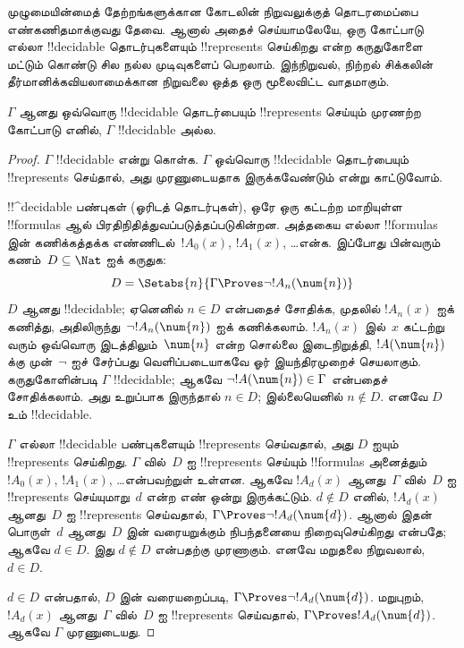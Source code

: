 \documentclass[../../../include/open-logic-section]{subfiles}
\begin{document}



முழுமையின்மைத் தேற்றங்களுக்கான கோடலின் நிறுவலுக்குத் தொடரமைப்பை
எண்கணிதமாக்குவது தேவை. ஆனால் அதைச் செய்யாமலேயே, ஒரு கோட்பாடு எல்லா
!!{decidable} தொடர்புகளையும் !!{represents} செய்கிறது என்ற கருதுகோளை
மட்டும் கொண்டு சில நல்ல முடிவுகளைப் பெறலாம். இந்நிறுவல், நிற்றல் சிக்கலின்
தீர்மானிக்கவியலாமைக்கான நிறுவலை ஒத்த ஒரு மூலைவிட்ட வாதமாகும்.

\begin{thm}
$\Gamma$ ஆனது ஒவ்வொரு !!{decidable} தொடர்பையும் !!{represents} செய்யும்
முரணற்ற கோட்பாடு எனில், $\Gamma$ !!{decidable} அல்ல.
\end{thm}

\begin{proof}
$\Gamma$ !!{decidable} என்று கொள்க. $\Gamma$ ஒவ்வொரு !!{decidable}
தொடர்பையும் !!{represents} செய்தால், அது முரணுடையதாக இருக்கவேண்டும் என்று
காட்டுவோம்.

!!^{decidable} பண்புகள் (ஓரிடத் தொடர்புகள்), ஒரே ஒரு கட்டற்ற மாறியுள்ள
!!{formula}s ஆல் பிரதிநிதித்துவப்படுத்தப்படுகின்றன. அத்தகைய எல்லா
!!{formula}s இன் கணிக்கத்தக்க எண்ணிடல்~$!A_0(x)$, $!A_1(x)$, \dots என்க.
இப்போது பின்வரும் கணம்~$D \subseteq \Nat$ ஐக் கருதுக:
\[
D = \Setabs{n}{\Gamma \Proves \lnot !A_n(\num{n})}
\]
$D$ ஆனது !!{decidable}; ஏனெனில் $n \in D$ என்பதைச் சோதிக்க, முதலில்
$!A_n(x)$ ஐக் கணித்து, அதிலிருந்து~$\lnot !A_n(\num{n})$ ஐக் கணிக்கலாம்.
$!A_n(x)$ இல்~$x$ கட்டற்று வரும் ஒவ்வொரு இடத்திலும்~$\num{n}$ என்ற சொல்லை
இடைநிறுத்தி, $!A(\num{n})$ க்கு முன்~$\lnot$ ஐச் சேர்ப்பது வெளிப்படையாகவே
ஓர் இயந்திரமுறைச் செயலாகும். கருதுகோளின்படி $\Gamma$ !!{decidable}; ஆகவே
$\lnot !A(\num{n}) \in \Gamma$ என்பதைச் சோதிக்கலாம். அது உறுப்பாக இருந்தால்
$n \in D$; இல்லையெனில் $n \notin D$. எனவே $D$ உம் !!{decidable}.

$\Gamma$ எல்லா !!{decidable} பண்புகளையும் !!{represents} செய்வதால், அது
$D$ ஐயும் !!{represents} செய்கிறது. $\Gamma$ வில்~$D$ ஐ
!!{represents} செய்யும் !!{formula}s அனைத்தும் $!A_0(x)$, $!A_1(x)$,
\dots என்பவற்றுள் உள்ளன. ஆகவே $!A_d(x)$ ஆனது~$\Gamma$ வில்~$D$ ஐ
!!{represents} செய்யுமாறு~$d$ என்ற எண் ஒன்று இருக்கட்டும். $d \notin D$
எனில், $!A_d(x)$ ஆனது~$D$ ஐ !!{represents} செய்வதால், $\Gamma \Proves
\lnot !A_d(\num{d})$. ஆனால் இதன் பொருள்~$d$ ஆனது~$D$ இன் வரையறுக்கும்
நிபந்தனையை நிறைவுசெய்கிறது என்பதே; ஆகவே $d \in D$. இது $d \notin D$
என்பதற்கு முரணாகும். எனவே மறுதலை நிறுவலால், $d \in D$.

$d \in D$ என்பதால், $D$ இன் வரையறைப்படி, $\Gamma \Proves \lnot
!A_d(\num{d})$. மறுபுறம், $!A_d(x)$ ஆனது~$\Gamma$ வில்~$D$ ஐ
!!{represents} செய்வதால், $\Gamma \Proves !A_d(\num{d})$. ஆகவே
$\Gamma$ முரணுடையது.
\end{proof}
\end{document}
